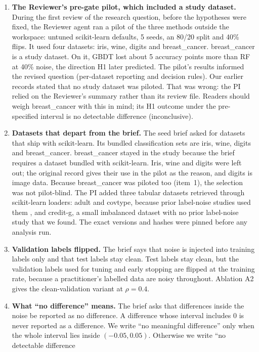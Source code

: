 \documentclass[11pt]{article}
\newcommand{\ds}[1]{\textsf{#1}}
\newcommand{\bc}{\ds{breast\_cancer}}
\newcommand{\cg}{\ds{credit-g}}
\newcommand{\ad}{\ds{adult}}
\newcommand{\ct}{\ds{covtype}}
\begin{document}
\begin{enumerate}
  \item \textbf{The Reviewer's pre-gate pilot, which included a study dataset.} During the
  first review of the research question, before the hypotheses were fixed, the Reviewer
  agent ran a pilot of the three methods outside the workspace: untuned scikit-learn
  defaults, 5 seeds, an 80/20 split and 40\% flips. It used four datasets: iris, wine,
  digits and \bc. \bc{} is a study dataset. On it, GBDT lost about 5 accuracy points more
  than RF at 40\% noise, the direction H1 later predicted. The pilot's results informed the
  revised question (per-dataset reporting and decision rules). Our earlier records stated
  that no study dataset was piloted. That was wrong: the PI relied on the Reviewer's summary
  rather than its review file. Readers should weigh \bc{} with this in mind; its H1
  outcome under the pre-specified interval is no detectable difference (inconclusive).
  \item \textbf{Datasets that depart from the brief.} The seed brief asked for datasets that
  ship with scikit-learn. Its bundled classification sets are iris, wine, digits and \bc.
  \bc{} stayed in the study because the brief requires a dataset bundled with scikit-learn.
  Iris, wine and digits were left out; the original record gives their use in the pilot as
  the reason, and digits is image data. Because \bc{} was piloted too (item~1), the
  selection was not pilot-blind. The PI added three
  tabular datasets retrieved through scikit-learn loaders: \ad{} and \ct, because prior
  label-noise studies used them \citep{lebaher2020,eisenburger2024}, and \cg, a small
  imbalanced dataset with no prior label-noise study that we found. The exact versions and
  hashes were pinned before any analysis run.
  \item \textbf{Validation labels flipped.} The brief says that noise is injected into
  training labels only and that test labels stay clean. Test labels stay clean, but the
  validation labels used for tuning and early stopping are flipped at the training rate,
  because a practitioner's labelled data are noisy throughout. Ablation A2 gives the
  clean-validation variant at $\rho=0.4$.
  \item \textbf{What ``no difference'' means.} The brief asks that differences inside the
  noise be reported as no difference. A difference whose interval includes 0 is never
  reported as a difference. We write ``no meaningful difference'' only when the whole
  interval lies inside $(-0.05, 0.05)$. Otherwise we write ``no detectable difference

\end{enumerate}
\end{document}
